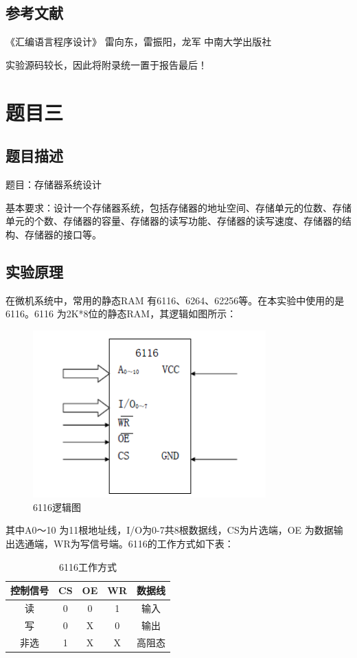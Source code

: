 \documentclass[UTF8,12pt]{article}
\begin{document}
\subsection{参考文献}
《汇编语言程序设计》    雷向东，雷振阳，龙军   中南大学出版社

实验源码较长，因此将附录统一置于报告最后！


\section{题目三}
\subsection{题目描述}
题目：存储器系统设计

基本要求：设计一个存储器系统，包括存储器的地址空间、存储单元的位数、存储单元的个数、存储器的容量、存储器的读写功能、存储器的读写速度、存储器的结构、存储器的接口等。

\subsection{实验原理}
在微机系统中，常用的静态RAM 有6116、6264、62256等。在本实验中使用的是6116。6116 为2K*8位的静态RAM，其逻辑如图所示：

\begin{figure}[htbp]
    \centering
    \includegraphics[width=0.8\textwidth]{img/14.png}
    \caption{6116逻辑图}
\end{figure}

其中A0～10 为11根地址线，I/O为0-7共8根数据线，CS为片选端，OE 为数据输出选通端，WR为写信号端。6116的工作方式如下表：

\begin{table}[htbp]
    \centering
    \caption{6116工作方式}
    \begin{tabular}{|c|c|c|c|c|}
        \hline
        控制信号 & CS & OE & WR & 数据线  \\
        \hline
        读 & 0 & 0 & 1 & 输入 \\
        \hline
        写 & 0 & X & 0 & 输出 \\
        \hline
        非选 & 1 & X & X & 高阻态 \\
        \hline
    \end{tabular}
\end{table}
\end{document}
